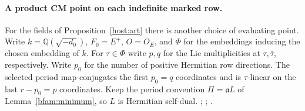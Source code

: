 \paragraph{A product CM point on each indefinite marked row.}
For the fields of Proposition~\ref{host:art} there is another
choice of evaluating point. Write \(k=\mathbb Q(\sqrt{-d_0})\),
\(F_0=E^+\), \(O=O_E\), and \(\Phi\) for the embeddings inducing
the chosen embedding of \(k\). For \(\tau\in\Phi\) write \(p,q\)
for the Lie multiplicities at \(\tau,\bar\tau\), respectively.
Write \(p_0\) for the number of positive Hermitian row directions.
The selected period map conjugates the first \(p_0=q\) coordinates
and is \(\tau\)-linear on the last \(r-p_0=p\) coordinates.
Keep the period convention \(\Pi=\mathfrak a L\) of
Lemma~\ref{bfam:minimum}, so \(L\) is Hermitian self-dual.
;
;
.

